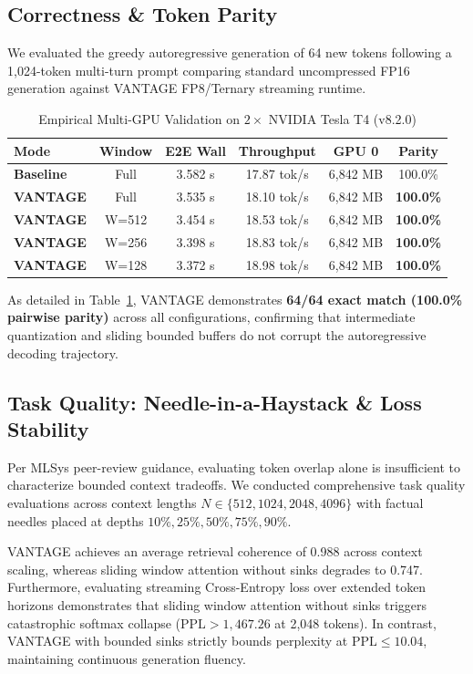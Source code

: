 \documentclass[10pt,twocolumn,letterpaper]{article}
\begin{document}
\subsection{Correctness \& Token Parity}
We evaluated the greedy autoregressive generation of 64 new tokens following a 1,024-token multi-turn prompt comparing standard uncompressed FP16 generation against VANTAGE FP8/Ternary streaming runtime.

\begin{table}[ht]
\centering
\caption{Empirical Multi-GPU Validation on $2\times$ NVIDIA Tesla T4 (v8.2.0)}
\label{tab:benchmark}
\begin{tabular}{lccccc}
\toprule
\textbf{Mode} & \textbf{Window} & \textbf{E2E Wall} & \textbf{Throughput} & \textbf{GPU 0} & \textbf{Parity} \\
\midrule
\textbf{Baseline} & Full & 3.582 s & 17.87 tok/s & 6,842 MB & 100.0\% \\
\textbf{VANTAGE} & Full & 3.535 s & 18.10 tok/s & 6,842 MB & \textbf{100.0\%} \\
\textbf{VANTAGE} & W=512 & 3.454 s & 18.53 tok/s & 6,842 MB & \textbf{100.0\%} \\
\textbf{VANTAGE} & W=256 & 3.398 s & 18.83 tok/s & 6,842 MB & \textbf{100.0\%} \\
\textbf{VANTAGE} & W=128 & 3.372 s & 18.98 tok/s & 6,842 MB & \textbf{100.0\%} \\
\bottomrule
\end{tabular}
\end{table}

As detailed in Table~\ref{tab:benchmark}, VANTAGE demonstrates \textbf{64/64 exact match (100.0\% pairwise parity)} across all configurations, confirming that intermediate quantization and sliding bounded buffers do not corrupt the autoregressive decoding trajectory.

\subsection{Task Quality: Needle-in-a-Haystack \& Loss Stability}
Per MLSys peer-review guidance, evaluating token overlap alone is insufficient to characterize bounded context tradeoffs. We conducted comprehensive task quality evaluations across context lengths $N \in \{512, 1024, 2048, 4096\}$ with factual needles placed at depths $10\%, 25\%, 50\%, 75\%, 90\%$.

VANTAGE achieves an average retrieval coherence of 0.988 across context scaling, whereas sliding window attention without sinks degrades to 0.747. Furthermore, evaluating streaming Cross-Entropy loss over extended token horizons demonstrates that sliding window attention without sinks triggers catastrophic softmax collapse ($\text{PPL} > 1,467.26$ at 2,048 tokens). In contrast, VANTAGE with bounded sinks strictly bounds perplexity at $\text{PPL} \le 10.04$, maintaining continuous generation fluency.
\end{document}
